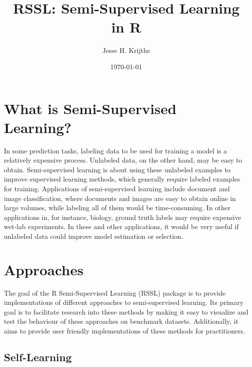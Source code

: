 \documentclass[final]{beamer}
\title
[] %
{ %
RSSL: Semi-Supervised Learning in R
}
\author{ %
Jesse H. Krijthe
}
\institute
[Very Large University] %
{
\inst{} Pattern Recognition Laboratory\\ Delft University of Technology, The Netherlands\\[0.3ex]
\inst{} Department of Molecular Epidemiology\\ Leiden University Medical Center, The Netherlands
}
\date{\today}
\begin{document}
\begin{frame}[t]
\begin{multicols}{3}

\section{What is Semi-Supervised Learning?}
In some prediction tasks, labeling data to be used for training a model is a relatively expensive process. Unlabeled data, on the other hand, may be easy to obtain. Semi-supervised learning is about using these unlabeled examples to improve supervised learning methods, which generally require labeled examples for training. Applications of semi-supervised learning include document and image classification, where documents and images are easy to obtain online in large volumes, while labeling all of them would be time-consuming. In other applications in, for instance, biology, ground truth labels may require expensive wet-lab experiments. In these and other applications, it would be very useful if unlabeled data could improve model estimation or selection.

\section{Approaches}
The goal of the R Semi-Supervised Learning (RSSL) package is to provide implementations of different approaches to semi-supervised learning. Its primary goal is to facilitate research into these methods by making it easy to visualize and test the behaviour of these approaches on benchmark datasets. Additionally, it aims to provide user friendly implementations of these methods for practitioners.

\subsection{Self-Learning}


\end{multicols}
\end{frame}
\end{document}
